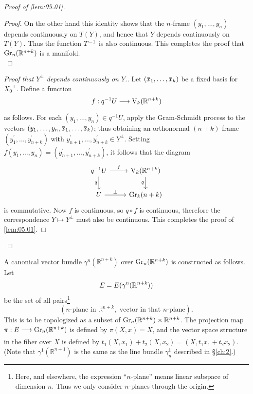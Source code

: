 \documentclass[../main]{subfiles}
\begin{document}
\begin{proof}[Proof of \ref{lem:05.01}]
\begin{proof}
On the other hand this identity shows that the $n$-frame $(y_1,\dots, y_n) $
depends continuously on $T(Y)$, and hence that $Y$ depends continuously
on $T(Y)$. Thus the function $T^{-1}$ is also continuous. This completes
the proof that $\operatorname{Gr}_n (\mathbb{R}^{n+k})$ is a manifold.\\
\end{proof}
\begin{proof}[Proof that $Y^\perp$ depends continuously on $Y$.]
Let $(\xoverline{x}_1,\dots,\xoverline{x}_k)$ be a fixed basis for $X_{0}{ }^{\perp}$. Define a function
\[f:q\inv U \varrightarrow{}\StiefelManifold_k(\mathbb{R}^{n+k})\]
as follows. For each $(y_{1}, \dots, y_{n}) \in q^{-1} U$, apply the Gram-Schmidt process to the vectors $(y_{1}, \dots, y_{n}, \xoverline{x}_{1}, \dots, \xoverline{x}_{k})$; thus obtaining an orthonormal $(n+k)$-frame $(y_{1}^{\prime}, \dots, y_{n+k}^{\prime})$ with $y_{n+1}^{\prime}, \dots, y_{n+k}^{\prime} \in Y^{\perp}$. Setting $f(y_{1}, \dots, y_{n})=(y_{n+1}^{\prime}, \dots, y_{n+k}^{\prime})$, it follows that the diagram
\[\begin{tikzcd}
	q\inv U \arrow[r, "f"] \arrow[d, "q"'] & \StiefelManifold_k(\mathbb{R}^{n+k}) \arrow[d, "q"'] \\
	U \arrow[r, "\perp"]                   & \grassmannian_{k}(n+k)                    
\end{tikzcd}\]
is commutative. Now $f$ is continuous, so $q \circ f$ is continuous, therefore the correspondence $Y \mapsto Y^{\perp}$ must also be continuous. This completes the proof of \ref{lem:05.01}.
\end{proof}
\end{proof}
A canonical vector bundle $\gamma^n(\mathbb{R}^{n+k})$ over $\operatorname{Gr}_n (\mathbb{R}^{n+k})$ is constructed
as follows. Let
\[E=E(\gamma^n(\mathbb{R}^{n+k}))\]
be the set of all pairs\footnote{Here, and elsewhere, the expression ``$n$-plane'' means linear subspace of
	dimension $n$. Thus we only consider $n$-planes through the origin.}
\[
 (\text {$n$-plane in } \mathbb{R}^{n+k}, \text { vector in that $n$-plane}). 
\]
This is to be topologized as a subset of $\operatorname{Gr}_n (\mathbb{R}^{n+k})\times \mathbb{R}^{n+k}$. The projection map $\pi:\total\varrightarrow{} \grassmannian_n (\mathbb{R}^{n+k})$ is defined by $\pi(X, x)=X$, and the vector space structure in the fiber over $X$ is defined by $t_{1}(X, x_{1})+t_{2}(X, x_{2})= (X, t_{1} x_{1}+t_{2} x_{2}) .$ (Note that $\gamma^{1}(\mathbb{R}^{n+1})$ is the same as the line bundle $\gamma_{n}^{1}$ described in \S\ref{ch:2}.)
\end{document}
